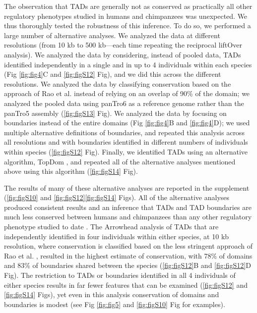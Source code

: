 The observation that TADs are generally not as conserved as practically all other regulatory phenotypes studied in humans and chimpanzees was unexpected. We thus thoroughly tested the robustness of this inference. To do so, we performed a large number of alternative analyses. We analyzed the data at different resolutions (from 10 kb to 500 kb---each time repeating the reciprocal liftOver analysis). We analyzed the data by considering, instead of pooled data, TADs identified independently in a single and in up to 4 individuals within each species (Fig \ref{fig:fig4}C and \ref{fig:figS12} Fig), and we did this across the different resolutions. We analyzed the data by classifying conservation based on the approach of Rao et al. \cite{Rao.2014} instead of relying on an overlap of 90\% of the domain; we analyzed the pooled data using panTro6 as a reference genome rather than the panTro5 assembly (\ref{fig:figS13} Fig). We analyzed the data by focusing on boundaries instead of the entire domains (Fig \ref{fig:fig4}B and \ref{fig:fig4}D); we used multiple alternative definitions of boundaries, and repeated this analysis across all resolutions and with boundaries identified in different numbers of individuals within species (\ref{fig:figS12} Fig). Finally, we identified TADs using an alternative algorithm, TopDom \cite{Shin.2016}, and repeated all of the alternative analyses mentioned above using this algorithm (\ref{fig:figS14} Fig).

The results of many of these alternative analyses are reported in the supplement (\ref{fig:figS10} and \ref{fig:figS12}{\textendash}\ref{fig:figS14} Figs). All of the alternative analyses produced consistent results and an inference that TADs and TAD boundaries are much less conserved between humans and chimpanzees than any other regulatory phenotype studied to date \cite{Pai.2011, Shulha.2012, Calarco.2007, Trizzino.2017, Prescott.2015, Kim.2011}. The Arrowhead analysis of TADs that are independently identified in four individuals within either species, at 10 kb resolution, where conservation is classified based on the less stringent approach of Rao et al. \cite{Rao.2014}, resulted in the highest estimate of conservation, with 78\% of domains and 83\% of boundaries shared between the species (\ref{fig:figS12}B and \ref{fig:figS12}D Fig). The restriction to TADs or boundaries identified in all 4 individuals of either species results in far fewer features that can be examined (\ref{fig:figS12} and \ref{fig:figS14} Figs), yet even in this analysis conservation of domains and boundaries is modest (see Fig \ref{fig:fig5} and \ref{fig:figS10} Fig for examples).

